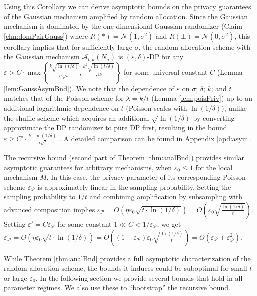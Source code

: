 \documentclass{article}
\newcommand{\NeurIPS}[1]{#1}
\newcommand{\Arxiv}[1]{}
\newcommand{\mainThmAsym}{thm:analBnd}
\newcommand{\mainThmRec}{thm:analBnd}
\newcommand{\NeurIPS}[1]{}
\newcommand{\Arxiv}[1]{#1}
\newcommand{\mainThmAsym}{thm:asymBnd}
\newcommand{\mainThmRec}{thm:recBnd}
\theoremstyle{plain}
\theoremstyle{definition}
\newcommand{\eps}{\varepsilon}
\newcommand{\alg}{M}
\newcommand{\rand}{R}
\newcommand{\alloc}[2]{\mathcal{A}_{#1}\left(#2\right)}
\begin{document}
Using this Corollary we can derive asymptotic bounds on the privacy guarantees of the Gaussian mechanism amplified by random allocation. Since the Gaussian mechanism is dominated by the one-dimensional Gaussian randomizer (Claim \ref{clm:domPairGauss}) where $\rand(*) = \mathcal{N}(1, \sigma^{2})$ and $\rand(\bot) = \mathcal{N}(0, \sigma^{2})$, this corollary implies that for sufficiently large $\sigma$, the random allocation scheme with the Gaussian mechanism  $\alloc{t, k}{N_{\sigma}}$ is $(\eps, \delta)$-DP for any $\eps > C \cdot \max\left\{\frac{k \sqrt{\ln(t/\delta)}}{\sigma \sqrt{t}}, \frac{k^{2} \sqrt{\ln(t/\delta)}}{t^{1.5}}\right\}$ for some universal constant $C$ (Lemma \ref{lem:GaussAsymBnd}). We note that the dependence of $\eps$ on $\sigma$; $\delta$; $k$; and $t$ matches that of the Poisson scheme for $\lambda = k / t$ (Lemma \ref{lem:poisPriv}) up to an additional logarithmic dependence on $t$ (Poisson scales with $\ln(1/\delta)$),
unlike the shuffle scheme which acquires an additional $\sqrt{\ln(1/\delta)}$ by converting approximate the DP randomizer to pure DP first, resulting in the bound $\eps \ge C' \cdot \frac{k \cdot \ln(1/\delta)}{\sigma \sqrt{t}}$ \citep{FMT21}. A detailed comparison can be found in Appendix \ref{apd:asym}.

The recursive bound (\NeurIPS{second part of }Theorem \ref{\mainThmRec}) provides similar asymptotic guarantees for arbitrary mechanisms, when $\eps_{0} \le 1$ for the local mechanism $\alg$. In this case, the privacy parameter of its corresponding Poisson scheme $\eps_{\mathcal{P}}$ is approximately linear in the sampling probability. Setting the sampling probability to $1/t$ and combining amplification by subsampling with advanced composition implies $\eps_{\mathcal{P}} = O\left(\eta \eps_{0} \sqrt{t \cdot \ln(1/\delta)} \right) = O\left(\eps_{0} \sqrt{\frac{\ln(1/\delta)}{t}} \right)$. Setting $\eps' = C \eps_{\mathcal{P}}$ for some constant $1 \ll C < 1/\eps_{\mathcal{P}}$, we get $\eps_{\mathcal{A}} = O\left(\eta \eps_{0} \sqrt{t \cdot \ln(1/\delta)} \right) =  O\left((1 + \eps_{\mathcal{P}})\eps_{0} \sqrt{\frac{\ln(1/\delta)}{t}} \right) = O(\eps_{\mathcal{P}} + \eps_{\mathcal{P}}^{2})$.

While Theorem \ref{\mainThmAsym} provides a full asymptotic characterization of the random allocation scheme, the bounds it induces could be suboptimal for small $t$ or large $\eps_{0}$. In the following section we provide several  bounds that hold in all parameter regimes. We also use these to ``bootstrap'' the recursive bound\Arxiv{ (Theorem \ref{\mainThmRec})}. 
\end{document}
